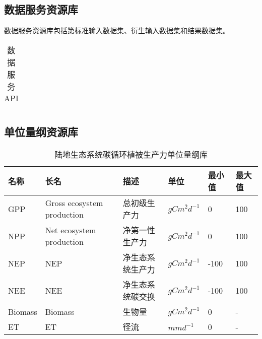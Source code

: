 \subsection{数据服务资源库}

数据服务资源库包括第标准输入数据集、衍生输入数据集和结果数据集。

\begin{table}
    \centering
    \caption{数据服务API}
    \label{tab:model-service-API}
    \begin{threeparttable}
        \begin{tabu} to 1
            \toprule[1.5pt]
            \midrule[1.5pt]
            \bottomrule[1.5pt]
        \end{tabu}
    \end{threeparttable}
\end{table}

\subsection{单位量纲资源库}


\begin{table}[!htbp]
    \centering
    \caption{陆地生态系统碳循环植被生产力单位量纲库}
    \label{tab:std-metrics}
    \begin{threeparttable}
        \begin{tabu}{ X[l m] X[5 l m] X[4 l m] X[l m] X[c m] X[c m]}
            \toprule[1.5pt]
            \textbf{名称} & \textbf{长名} & \textbf{描述} & \textbf{单位} & \textbf{最小值} & \textbf{最大值}  \\
            \midrule[1.5pt]
            GPP & Gross ecosystem production & 总初级生产力 & $gC m^2 d^{-1}$ & 0 & 100 \\
            NPP & Net ecosystem production & 净第一性生产力 & $gC m^2 d^{-1}$ & 0 & 100 \\
            NEP & NEP & 净生态系统生产力 & $gC m^2 d^{-1}$ & -100 & 100 \\
            NEE & NEE & 净生态系统碳交换 & $gC m^2 d^{-1}$ & -100 & 100 \\
            Biomass & Biomass & 生物量 & $gC m^2 d^{-1}$ & 0 & - \\
            ET & ET & 径流 & $mm d^{-1}$ & 0 & - \\
            \bottomrule[1.5pt]
        \end{tabu}
    \end{threeparttable}
\end{table}

